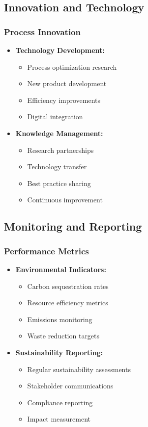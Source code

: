 \subsection{Innovation and Technology}

\subsubsection{Process Innovation}
\begin{itemize}
    \item \textbf{Technology Development:}
    \begin{itemize}
        \item Process optimization research
        \item New product development
        \item Efficiency improvements
        \item Digital integration
    \end{itemize}
    
    \item \textbf{Knowledge Management:}
    \begin{itemize}
        \item Research partnerships
        \item Technology transfer
        \item Best practice sharing
        \item Continuous improvement
    \end{itemize}
\end{itemize}

\subsection{Monitoring and Reporting}

\subsubsection{Performance Metrics}
\begin{itemize}
    \item \textbf{Environmental Indicators:}
    \begin{itemize}
        \item Carbon sequestration rates
        \item Resource efficiency metrics
        \item Emissions monitoring
        \item Waste reduction targets
    \end{itemize}
    
    \item \textbf{Sustainability Reporting:}
    \begin{itemize}
        \item Regular sustainability assessments
        \item Stakeholder communications
        \item Compliance reporting
        \item Impact measurement
    \end{itemize}
\end{itemize}

